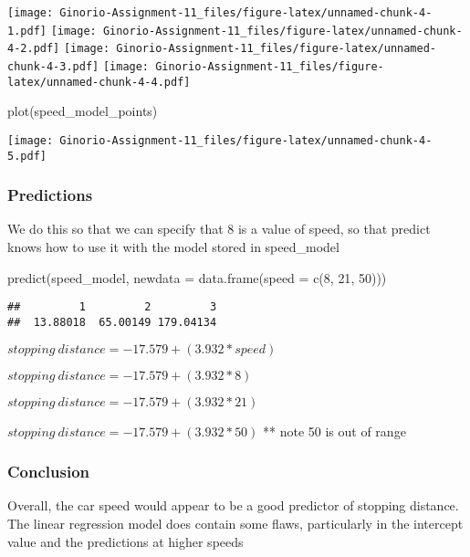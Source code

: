 \documentclass[
]{article}
\newenvironment{Shaded}{\begin{snugshade}}{\end{snugshade}}
\newcommand{\AttributeTok}[1]{\textcolor[rgb]{0.77,0.63,0.00}{#1}}
\newcommand{\DecValTok}[1]{\textcolor[rgb]{0.00,0.00,0.81}{#1}}
\newcommand{\FunctionTok}[1]{\textcolor[rgb]{0.00,0.00,0.00}{#1}}
\newcommand{\NormalTok}[1]{#1}
\begin{document}
\texttt{[image: Ginorio-Assignment-11\_files/figure-latex/unnamed-chunk-4-1.pdf]}
\texttt{[image: Ginorio-Assignment-11\_files/figure-latex/unnamed-chunk-4-2.pdf]}
\texttt{[image: Ginorio-Assignment-11\_files/figure-latex/unnamed-chunk-4-3.pdf]}
\texttt{[image: Ginorio-Assignment-11\_files/figure-latex/unnamed-chunk-4-4.pdf]}

\begin{Shaded}
\begin{Highlighting}[]
\FunctionTok{plot}\NormalTok{(speed\_model\_points)}
\end{Highlighting}
\end{Shaded}

\texttt{[image: Ginorio-Assignment-11\_files/figure-latex/unnamed-chunk-4-5.pdf]}

\hypertarget{predictions}{%
\subsubsection{Predictions}\label{predictions}}

We do this so that we can specify that 8 is a value of speed, so that
predict knows how to use it with the model stored in speed\_model

\begin{Shaded}
\begin{Highlighting}[]
\FunctionTok{predict}\NormalTok{(speed\_model, }\AttributeTok{newdata =} \FunctionTok{data.frame}\NormalTok{(}\AttributeTok{speed =} \FunctionTok{c}\NormalTok{(}\DecValTok{8}\NormalTok{, }\DecValTok{21}\NormalTok{, }\DecValTok{50}\NormalTok{)))}
\end{Highlighting}
\end{Shaded}

\begin{verbatim}
##         1         2         3 
##  13.88018  65.00149 179.04134
\end{verbatim}

\(stopping\ distance = -17.579 + (3.932 * speed)\)

\(stopping\ distance = -17.579 + (3.932 * 8)\)

\(stopping\ distance = -17.579 + (3.932 * 21)\)

\(stopping\ distance = -17.579 + (3.932 * 50)\) ** note 50 is out of
range

\hypertarget{conclusion}{%
\subsubsection{Conclusion}\label{conclusion}}

Overall, the car speed would appear to be a good predictor of stopping
distance. The linear regression model does contain some flaws,
particularly in the intercept value and the predictions at higher speeds
\end{document}
